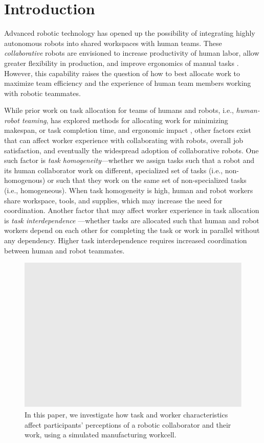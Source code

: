 \section{Introduction}
Advanced robotic technology has opened up the possibility of integrating highly autonomous robots into shared workspaces with human teams. These \textit{collaborative} robots are envisioned to increase productivity of human labor, allow greater flexibility in production, and improve ergonomics of manual tasks \cite{peshkin1999cobots, tan2009human}. However, this capability raises the question of how to best allocate work to maximize team efficiency and the experience of human team members working with robotic teammates.
       
While prior work on task allocation for teams of humans and robots, i.e., \textit{human-robot teaming}, has explored methods for allocating work for minimizing makespan, or task completion time, and ergonomic impact \cite{shah2011improved, gombolay2014decision, tsarouchi2017ijcim}, other factors exist that can affect worker experience with collaborating with robots, overall job satisfaction, and eventually the widespread adoption of collaborative robots. One such factor is \textit{task homogeneity}---whether we assign tasks such that a robot and its human collaborator work on different, specialized set of tasks (i.e., non-homogenous) or such that they work on the same set of non-specialized tasks (i.e., homogeneous). When task homogeneity is high, human and robot workers share workspace, tools, and supplies, which may increase the need for coordination. Another factor that may affect worker experience in task allocation is \textit{task interdependence} \cite{kiggundu1983task}---whether tasks are allocated such that human and robot workers depend on each other for completing the task or work in parallel without any dependency. Higher task interdependence requires increased coordination between human and robot teammates. 

\begin{figure}[t!]
	\caption{In this paper, we investigate how task and worker characteristics affect participants' perceptions of a robotic collaborator and their work, using a simulated manufacturing workcell.}
	\label{fig:teaser}
	\includegraphics[width=\columnwidth]{figures/hri18-aksari-figures_placeholder-column.pdf}
\end{figure} 

